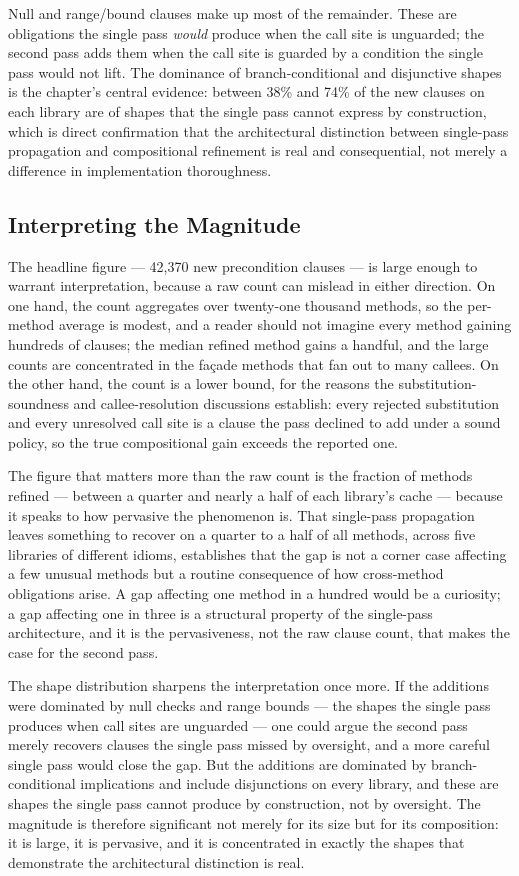Null and range/bound clauses make up most of the remainder. These are
obligations the single pass \emph{would} produce when the call site is
unguarded; the second pass adds them when the call site is guarded by a
condition the single pass would not lift. The dominance of branch-conditional
and disjunctive shapes is the chapter's central evidence: between 38\% and 74\%
of the new clauses on each library are of shapes that the single pass cannot
express by construction, which is direct confirmation that the architectural
distinction between single-pass propagation and compositional refinement is real
and consequential, not merely a difference in implementation thoroughness.

\subsection{Interpreting the Magnitude}

The headline figure --- 42{,}370 new precondition clauses --- is large enough to
warrant interpretation, because a raw count can mislead in either direction. On one
hand, the count aggregates over twenty-one thousand methods, so the per-method
average is modest, and a reader should not imagine every method gaining hundreds of
clauses; the median refined method gains a handful, and the large counts are
concentrated in the fa\c{c}ade methods that fan out to many callees. On the other
hand, the count is a lower bound, for the reasons the substitution-soundness and
callee-resolution discussions establish: every rejected substitution and every
unresolved call site is a clause the pass declined to add under a sound policy, so
the true compositional gain exceeds the reported one.

The figure that matters more than the raw count is the fraction of methods refined
--- between a quarter and nearly a half of each library's cache --- because it
speaks to how pervasive the phenomenon is. That single-pass propagation leaves
something to recover on a quarter to a half of all methods, across five libraries
of different idioms, establishes that the gap is not a corner case affecting a few
unusual methods but a routine consequence of how cross-method obligations arise. A
gap affecting one method in a hundred would be a curiosity; a gap affecting one in
three is a structural property of the single-pass architecture, and it is the
pervasiveness, not the raw clause count, that makes the case for the second pass.

The shape distribution sharpens the interpretation once more. If the additions were
dominated by null checks and range bounds --- the shapes the single pass produces
when call sites are unguarded --- one could argue the second pass merely recovers
clauses the single pass missed by oversight, and a more careful single pass would
close the gap. But the additions are dominated by branch-conditional implications
and include disjunctions on every library, and these are shapes the single pass
cannot produce by construction, not by oversight. The magnitude is therefore
significant not merely for its size but for its composition: it is large, it is
pervasive, and it is concentrated in exactly the shapes that demonstrate the
architectural distinction is real.

